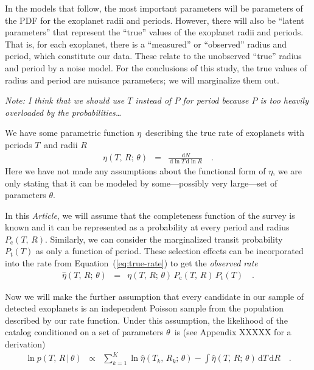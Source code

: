 \documentclass[12pt,preprint]{aastex}
\newcommand{\paper}{\emph{Article}}
\newcommand{\Eq}[1]{Equation~(\ref{eq:#1})}
\newcommand{\eq}[1]{\Eq{#1}}
\newcommand{\eqlabel}[1]{\label{eq:#1}}
\newcommand{\dd}{\ensuremath{\,\mathrm{d}}}
\newcommand{\rate}{\ensuremath{\eta}}
\newcommand{\ratepars}{\ensuremath{\theta}}
\newcommand{\obs}[1]{\ensuremath{\hat{#1}}}
\newcommand{\radius}{\ensuremath{R}}
\newcommand{\period}{\ensuremath{T}}
\newcommand{\completeness}{\ensuremath{P_\mathrm{c}}}
\newcommand{\transitprob}{\ensuremath{P_\mathrm{t}}}
\begin{document}
In the models that follow, the most important parameters will be parameters
of the PDF for the exoplanet radii and periods.
However, there will also be ``latent parameters'' that represent the ``true''
values of the exoplanet radii and periods.
That is, for each exoplanet, there is a ``measured'' or ``observed'' radius
and period, which constitute our data.
These relate to the unobserved ``true'' radius and period by a noise model.
For the conclusions of this study, the true values of radius and period are
nuisance parameters; we will marginalize them out.

\emph{Note: I think that we should use $T$ instead of $P$ for period because
$P$ is too heavily overloaded by the probabilities\ldots}

We have some parametric function \rate\ describing the true rate of exoplanets
with periods \period\ and radii \radius
\begin{eqnarray}\eqlabel{true-rate}
\rate (\period,\,\radius;\,\ratepars)
&=& \frac{\dd N}{\dd\ln\period\dd\ln\radius}\quad.
\end{eqnarray}
Here we have not made any assumptions about the functional form of \rate, we
are only stating that it can be modeled by some---possibly very large---set of
parameters \ratepars.

In this \paper, we will assume that the completeness function of the survey is
known and it can be represented as a probability at every period and radius
$\completeness (\period,\,\radius)$.
Similarly, we can consider the marginalized transit probability $\transitprob
(\period)$ as only a function of period.
These selection effects can be incorporated into the rate from \eq{true-rate}
to get the \emph{observed rate}
\begin{eqnarray}\eqlabel{obs-rate}
\obs{\rate} (\period,\,\radius;\,\ratepars)
&=& \rate (\period,\,\radius;\,\ratepars)\,\completeness(\period,\,\radius)\,
\transitprob(\period)\quad.
\end{eqnarray}

Now we will make the further assumption that every candidate in our sample of
detected exoplanets is an independent Poisson sample from the population
described by our rate function.
Under this assumption, the likelihood of the catalog conditioned on a set of
parameters \ratepars\ is (see Appendix XXXXX for a derivation)
\begin{eqnarray}
\ln p(\period,\,\radius\,|\,\ratepars) &\propto&
\sum_{k=1}^K \ln\obs{\rate} (\period_k,\,\radius_k;\,\ratepars)
- \int \obs{\rate} (\period,\,\radius;\,\ratepars) \dd\period\dd\radius
\quad.
\end{eqnarray}
\end{document}
